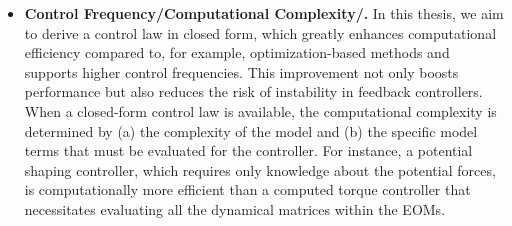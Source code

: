 \begin{itemize}
    \item \textbf{Control Frequency/Computational Complexity/.} 
    In this thesis, we aim to derive a control law in closed form, which greatly enhances computational efficiency compared to, for example, optimization-based methods and supports higher control frequencies. This improvement not only boosts performance but also reduces the risk of instability in feedback controllers. When a closed-form control law is available, the computational complexity is determined by (a) the complexity of the model and (b) the specific model terms that must be evaluated for the controller. For instance, a potential shaping controller, which requires only knowledge about the potential forces, is computationally more efficient than a computed torque controller that necessitates evaluating all the dynamical matrices within the \glspl{EOM}.

\end{itemize}
